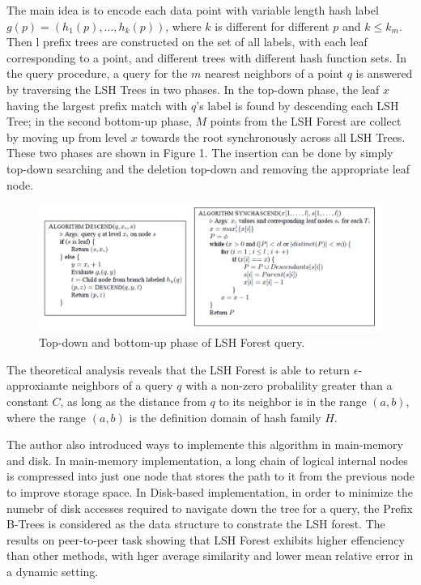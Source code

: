 The main idea is to encode each data point with variable length hash label $g(p)=(h_1(p), ..., h_k(p))$, where $k$ is different for different $p$ and $k\leq k_m$. Then l prefix trees are constructed on the set of all labels, with each leaf corresponding to a point, and different trees with different hash function sets. In the query procedure, a query for the $m$ nearest neighbors of a point $q$ is answered by traversing the LSH Trees in two phases. In the top-down phase, the leaf $x$ having the largest prefix match with $q$'s label is found by descending each LSH Tree; in the second bottom-up phase, $M$ points from the LSH Forest are collect by moving up from level $x$ towards the root synchronously across all LSH Trees. These two phases are shown in Figure 1. The insertion can be done by simply top-down searching and the deletion top-down and removing the appropriate leaf node.
\begin{figure}
	\begin{center}
		\includegraphics[width=6in]{./image/1.png}
		\caption{Top-down and bottom-up phase of LSH Forest query.}
	\end{center}
\end{figure}

The theoretical analysis reveals that the LSH Forest is able to return $\epsilon$-approxiamte neighbors of a query $q$ with a non-zero probalility greater than a constant $C$, as long as the distance from $q$ to its neighbor is in the range $(a,b)$, where the range $(a,b)$ is the definition domain of hash family $H$. 

The author also introduced ways to implemente this algorithm in main-memory and disk. In main-memory implementation, a long chain of logical internal nodes is compressed into just one node that stores the path to it from the previous node to improve storage space. In Disk-based implementation, in order to minimize the numebr of disk accesses required to navigate down the tree for a query, the Prefix B-Trees is considered as the data structure to constrate the LSH forest. The results on peer-to-peer task showing that LSH Forest exhibits higher effenciency than other methods, with hger average similarity and lower mean relative error in a dynamic setting.
